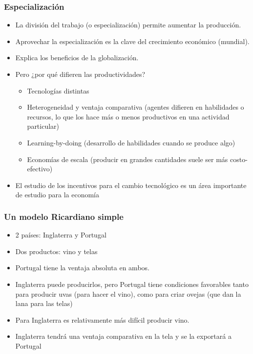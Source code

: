 \documentclass{beamer}
\begin{document}
\begin{frame}
    \frametitle{Especialización}
    \begin{itemize}
        \item La división del trabajo (o especialización) permite aumentar la producción.
        \item Aprovechar la especialización es la clave del crecimiento económico (mundial).
        \item Explica los beneficios de la globalización.
        \item Pero ¿por qué difieren las productividades?

        \begin{itemize}
            \item Tecnologías distintas
            \item Heterogeneidad y ventaja comparativa (agentes difieren en habilidades o recursos, lo que los hace más o menos productivos en una actividad particular)
            \item Learning-by-doing (desarrollo de habilidades cuando se produce algo)
            \item Economías de escala (producir en grandes cantidades suele ser más costo-efectivo)
        \end{itemize}
        \item El estudio de los incentivos para el cambio tecnológico es un área importante de estudio para la economía
    \end{itemize} 
\end{frame}

\begin{frame}
    \frametitle{Un modelo Ricardiano simple}
    \begin{itemize}
        \item 2 países: Inglaterra y Portugal
        \item Dos productos: vino y telas
        \item Portugal tiene la ventaja absoluta en ambos.
        \item Inglaterra puede producirlos, pero Portugal tiene condiciones favorables tanto para producir uvas (para hacer el vino), como para criar ovejas (que dan la lana para las telas)
        \item Para Inglaterra es relativamente más difícil producir vino.
        \item Inglaterra tendrá una ventaja comparativa en la tela y se la exportará a Portugal
    \end{itemize} 
\end{frame}
\end{document}
